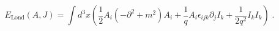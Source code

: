 \begin{equation}
E_{\mathrm{Lond}}(A,J)=\int d^{3}x\left( \frac{1}{2}A_{i}\left( -\partial
^{2}+m^{2}\right) A_{i}+\frac{1}{q}A_{i}\epsilon _{ijk}\partial _{j}I_{k}+%
\frac{1}{2q^{2}}I_{k}I_{k}\right) \;.  \label{ld}
\end{equation}

